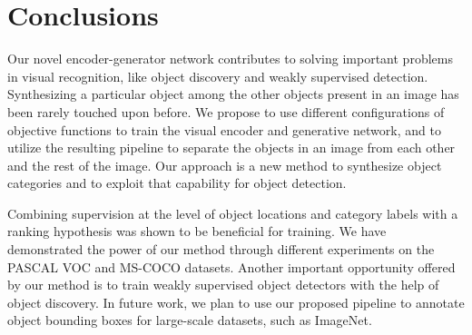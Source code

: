 \documentclass[runningheads]{llncs}
\begin{document}
\section{Conclusions}\label{sec:conc}
Our novel encoder-generator network contributes to solving important problems in visual recognition, like object discovery and weakly supervised detection. Synthesizing a particular object among the other objects present in an image has been rarely touched upon before. We propose to use different configurations of objective functions to train the visual encoder and generative network, and to utilize the resulting pipeline to separate the objects in an image from each other and the rest of the image. Our approach is a new method to synthesize object categories and to exploit that capability for object detection. 

Combining supervision at the level of object locations and category labels with a ranking hypothesis was shown to be beneficial for training. We have demonstrated the power of our method through different experiments on the PASCAL VOC and MS-COCO datasets. Another important opportunity offered by our method is to train weakly supervised object detectors with the help of object discovery. In future work, we plan to use our proposed pipeline to annotate object bounding boxes for large-scale datasets, such as ImageNet.

\iffalse
\emph{}
\noindent
\textbf{Acknowledgements:} This work was supported by DBOF PhD scholarship, KU Leuven:CAMETRON project, and KIT:DFG-PLUMCOT project. The authors would like to thank Nvidia for GPU donation.
\fi


\end{document}
